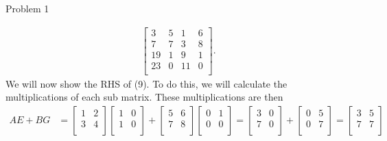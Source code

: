 \begin{problem}{Problem 1}
\begin{highlight}[Solution]
\begin{align*}
\begin{bmatrix}
                3 & 5 & 1 & 6 \\
                7 & 7 & 3 & 8 \\
                19 & 1 & 9 & 1 \\
                23 & 0 & 11 & 0 \\
            \end{bmatrix}.
        \end{align*}
        We will now show the RHS of (9). To do this, we will calculate the multiplications of each sub matrix. These multiplications are then 
        \begin{align*}
            AE + BG & = 
            \begin{bmatrix}
                1 & 2 \\
                3 & 4 \\
            \end{bmatrix}
            \begin{bmatrix}
                1 & 0 \\
                1 & 0 \\
            \end{bmatrix}
            + 
            \begin{bmatrix}
                5 & 6 \\
                7 & 8 \\
            \end{bmatrix}
            \begin{bmatrix}
                0 & 1 \\
                0 & 0 \\
            \end{bmatrix}
            = 
            \begin{bmatrix}
                3 & 0 \\
                7 & 0 \\
            \end{bmatrix}
            + 
            \begin{bmatrix}
                0 & 5 \\
                0 & 7 \\
            \end{bmatrix}
            = 
            \begin{bmatrix}
                3 & 5 \\
                7 & 7 \\
            \end{bmatrix} \\

\end{align*}
\end{highlight}
\end{problem}

